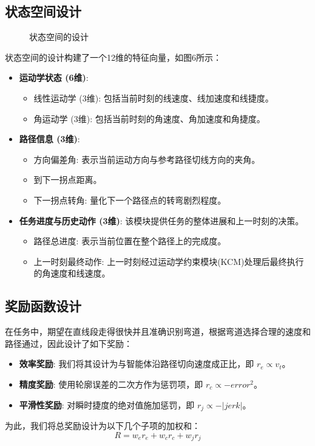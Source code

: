 \documentclass[preprint,12pt]{elsarticle}
\begin{document}
\subsection{状态空间设计}

\begin{figure}[htbp]
    \centering
    \caption{状态空间的设计}
    \label{fig:state_space}
\end{figure}

状态空间的设计构建了一个12维的特征向量，如图6所示：
\begin{itemize}
    \item \textbf{运动学状态 (6维)}:
    \begin{itemize}
        \item 线性运动学 (3维): 包括当前时刻的线速度、线加速度和线捷度。
        \item 角运动学 (3维): 包括当前时刻的角速度、角加速度和角捷度。
    \end{itemize}
    \item \textbf{路径信息 (3维)}:
    \begin{itemize}
        \item 方向偏差角: 表示当前运动方向与参考路径切线方向的夹角。
        \item 到下一拐点距离。
        \item 下一拐点转角: 量化下一个路径点的转弯剧烈程度。
    \end{itemize}
    \item \textbf{任务进度与历史动作 (3维)}: 该模块提供任务的整体进展和上一时刻的决策。
    \begin{itemize}
        \item 路径总进度: 表示当前位置在整个路径上的完成度。
        \item 上一时刻最终动作: 上一时刻经过运动学约束模块(KCM)处理后最终执行的角速度和线速度。
    \end{itemize}
\end{itemize}

\subsection{奖励函数设计}
在任务中，期望在直线段走得很快并且准确识别弯道，根据弯道选择合理的速度和路径通过，因此设计了如下奖励：
\begin{itemize}
    \item \textbf{效率奖励}: 我们将其设计为与智能体沿路径切向速度成正比，即 $r_e \propto v_t$。
    \item \textbf{精度奖励}: 使用轮廓误差的二次方作为惩罚项，即 $r_c \propto -error^2$。
    \item \textbf{平滑性奖励}: 对瞬时捷度的绝对值施加惩罚，即 $r_j \propto -|jerk|$。
\end{itemize}
为此，我们将总奖励设计为以下几个子项的加权和：
\begin{equation}
    R = w_e r_e + w_c r_c + w_j r_j
\end{equation}
\end{document}
